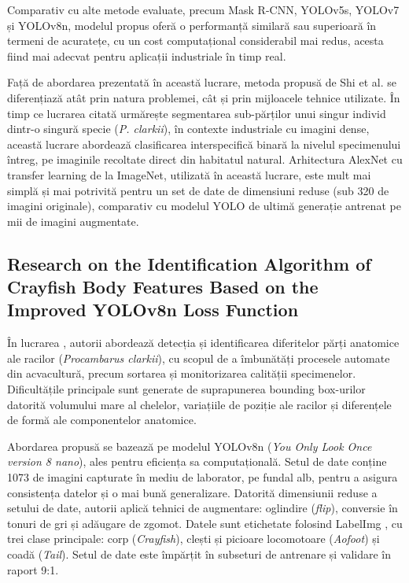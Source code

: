 Comparativ cu alte metode evaluate, precum Mask R-CNN, YOLOv5s, YOLOv7 și YOLOv8n, modelul propus oferă o performanță similară sau superioară în termeni de acuratețe, cu un cost computațional considerabil mai redus, acesta fiind mai adecvat pentru aplicații industriale în timp real.

Față de abordarea prezentată în această lucrare, metoda propusă de Shi et al. \cite{Lightweight_detection_and_segmentation_of_crayfish_parts_using_an_improved_YOLOv11n_segmentation_model} se diferențiază atât prin natura problemei, cât și prin mijloacele tehnice utilizate. În timp ce lucrarea citată urmărește segmentarea sub-părților unui singur individ dintr-o singură specie (\textit{P. clarkii}), în contexte industriale cu imagini dense, această lucrare abordează clasificarea interspecifică binară la nivelul specimenului întreg, pe imaginile recoltate direct din habitatul natural. Arhitectura AlexNet cu transfer learning de la ImageNet, utilizată în această lucrare, este mult mai simplă și mai potrivită pentru un set de date de dimensiuni reduse (sub 320 de imagini originale), comparativ cu modelul YOLO de ultimă generație antrenat pe mii de imagini augmentate.




\subsection{Research on the Identification Algorithm of Crayfish Body Features Based on the Improved YOLOv8n Loss Function}

În lucrarea \cite{Identification_Algorithm_of_Crayfish_Body_Features_Based_on_the_Improved_YOLOv8n_Loss_Function}, autorii abordează detecția și identificarea diferitelor părți anatomice ale racilor (\textit{Procambarus clarkii}), cu scopul de a îmbunătăți procesele automate din acvacultură, precum sortarea și monitorizarea calității specimenelor. Dificultățile principale sunt generate de suprapunerea bounding box-urilor datorită volumului mare al chelelor, variațiile de poziție ale racilor și diferențele de formă ale componentelor anatomice.

Abordarea propusă se bazează pe modelul YOLOv8n (\textit{You Only Look Once version 8 nano}), ales pentru eficiența sa computațională. Setul de date conține 1073 de imagini capturate în mediu de laborator, pe fundal alb, pentru a asigura consistența datelor și o mai bună generalizare. Datorită dimensiunii reduse a setului de date, autorii aplică tehnici de augmentare: oglindire (\textit{flip}), conversie în tonuri de gri și adăugare de zgomot. Datele sunt etichetate folosind LabelImg \cite{labelimg}, cu trei clase principale: corp (\textit{Crayfish}), clești și picioare locomotoare (\textit{Aofoot}) și coadă (\textit{Tail}). Setul de date este împărțit în subseturi de antrenare și validare în raport 9:1.

